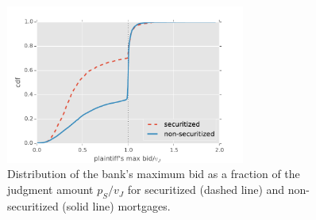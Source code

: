 \documentclass[11pt,twopage]{article}
\begin{document}
\begin{figure}
  \begin{center}
    \includegraphics[width=0.7\textwidth]{graphics/distr-maxbid-sec-nonsec}
    \caption{Distribution of the bank's maximum bid as a fraction of
      the judgment amount $p_S/v_J$ for securitized (dashed line) and
      non-securitized (solid line)
      mortgages.\label{fig:distr-maxbid-sec-nonsec}}
  \end{center}
\end{figure}
\end{document}
